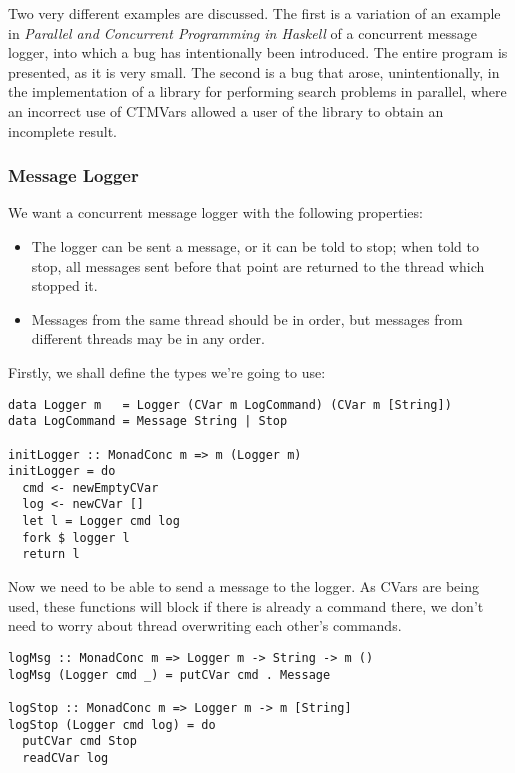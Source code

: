 Two very different examples are discussed. The first is a variation of
an example in \textit{Parallel and Concurrent Programming in
  Haskell}\cite{parconc} of a concurrent message logger, into which a
bug has intentionally been introduced. The entire program is
presented, as it is very small. The second is a bug that arose,
unintentionally, in the implementation of a library for performing
search problems in parallel, where an incorrect use of CTMVars allowed
a user of the library to obtain an incomplete result.

\subsubsection*{Message Logger}
\label{example-logger}

We want a concurrent message logger with the following properties:

\begin{itemize}
  \item The logger can be sent a message, or it can be told to stop;
    when told to stop, all messages sent before that point are
    returned to the thread which stopped it.

  \item Messages from the same thread should be in order, but messages
    from different threads may be in any order.
\end{itemize}

Firstly, we shall define the types we're going to use:

\begin{verbatim}
data Logger m   = Logger (CVar m LogCommand) (CVar m [String])
data LogCommand = Message String | Stop

initLogger :: MonadConc m => m (Logger m)
initLogger = do
  cmd <- newEmptyCVar
  log <- newCVar []
  let l = Logger cmd log
  fork $ logger l
  return l
\end{verbatim}

Now we need to be able to send a message to the logger. As CVars are
being used, these functions will block if there is already a command
there, we don't need to worry about thread overwriting each other's
commands.

\begin{verbatim}
logMsg :: MonadConc m => Logger m -> String -> m ()
logMsg (Logger cmd _) = putCVar cmd . Message

logStop :: MonadConc m => Logger m -> m [String]
logStop (Logger cmd log) = do
  putCVar cmd Stop
  readCVar log
\end{verbatim}

